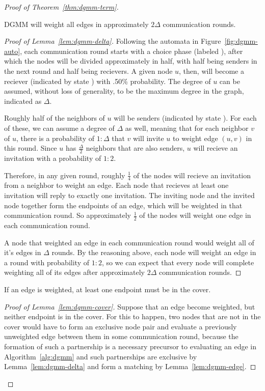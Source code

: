 \begin{proof}[Proof of Theorem~\ref{thm:dgmm-term}]
\begin{lem}
  \label{lem:dgmm-delta}
  DGMM will weight all edges in approximately $2\Delta$ communication rounds.
\end{lem}
\begin{proof}[Proof of Lemma~\ref{lem:dgmm-delta}]

Following the automata in Figure~\ref{fig:dgmm-auto}, each communication round starts with a choice phase (labeled \cCd), after which the nodes will be divided approximately in half, with half being senders in the next round and half being recievers. A given node $u$, then, will become a reciever (indicated by state \cLd) with .50\% probability. The degree of $u$ can be assumed, without loss of generality, to be the maximum degree in the graph, indicated as $\Delta$. 

Roughly half of the neighbors of $u$ will be senders (indicated by state \cId). For each of these, we can assume a degree of $\Delta$ as well, meaning that for each neighbor $v$ of $u$, there is a probability of $1:\Delta$ that $v$ will invite $u$ to weight edge $(u,v)$ in this round. Since $u$ has $\frac{\Delta}{2}$ neighbors that are also senders, $u$ will recieve an invitation with a probability of $1:2$. 

Therefore, in any given round, roughly $\frac{1}{4}$ of the nodes will recieve an invitation from a neighbor to weight an edge. Each node that recieves at least one invitation will reply to exactly one invitation. The inviting node and the invited node together form the endpoints of an edge, which will be weighted in that communication round. So approximately $\frac{1}{2}$ of the nodes will weight one edge in each communication round.

A node that weighted an edge in each communication round would weight all of it's edges in $\Delta$ rounds. By the reasoning above, each node will weight an edge in a round with probability of $1:2$, so we can expect that every node will complete weighting all of its edges after approximately $2\Delta$ communication rounds.

\end{proof}
\begin{lem}
  \label{lem:dgmm-cover}
  If an edge is weighted, at least one endpoint must be in the cover.
\end{lem}
\begin{proof}[Proof of Lemma~\ref{lem:dgmm-cover}]

  Suppose that an edge become weighted, but neither endpoint is in the cover. For this to happen, two nodes that are not in the cover would have to form an exclusive node pair and evaluate a previously unweighted edge between them in some communication round, because the formation of such a partnership is a necessary precursor to evaluating an edge in Algorithm~\ref{alg:dgmm} and such partnerships are exclusive by Lemma~\ref{lem:dgmm-delta} and form a matching by Lemma~\ref{lem:dgmm-edge}. 


\end{proof}
\end{proof}
